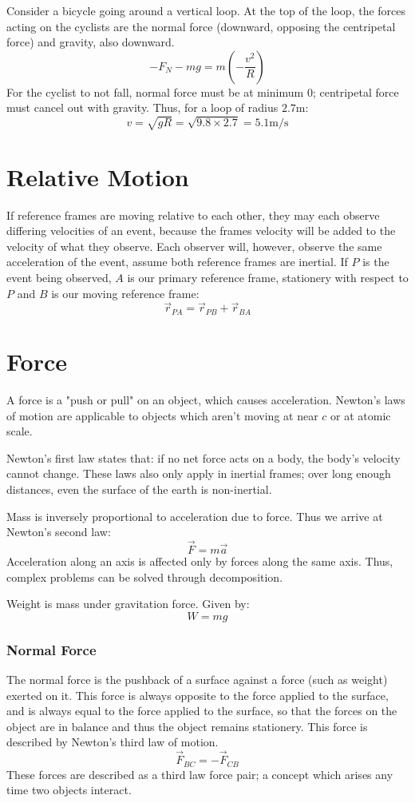 \documentclass[12pt]{report}
\begin{document}
\begin{flushleft}
\bigskip
Consider a bicycle going around a vertical loop. At the top of the loop, the forces acting on the cyclists
are the normal force (downward, opposing the centripetal force) and gravity, also downward.
\[-F_N - mg = m(-\frac{v^2}{R})\]
For the cyclist to not fall, normal force must be at minimum \(0\); centripetal force must cancel out with gravity.
Thus, for a loop of radius \(2.7\mathrm{m}\):
\[v = \sqrt{gR} = \sqrt{9.8 \times 2.7} = 5.1\mathrm{m/s}\]

\section*{Relative Motion}
If reference frames are moving relative to each other, they may each observe differing velocities of 
an event, because the frames velocity will be added to the velocity of what they observe. Each 
observer will, however, observe the same acceleration of the event, assume both reference frames
are inertial. If \(P\) is the event being observed, \(A\) is our primary reference frame, stationery
with respect to \(P\) and \(B\) is our moving reference frame:
\[\vec{r}_{PA} = \vec{r}_{PB} + \vec{r}_{BA}\]

\section*{Force}
A force is a "push or pull" on an object, which causes acceleration. Newton's laws of 
motion are applicable to objects which aren't moving at near \(c\) or at atomic scale.

\bigskip
Newton's first law states that: if no net force acts on a body, the body's velocity cannot change.
These laws also only apply in inertial frames; over long enough distances, even the surface of the 
earth is non-inertial.

\bigskip
Mass is inversely proportional to acceleration due to force. Thus we arrive at Newton's second law:
\[\vec{F} = m\vec{a}\]
Acceleration along an axis is affected only by forces along the same axis. Thus, complex
problems can be solved through decomposition.

\bigskip
Weight is mass under gravitation force. Given by:
\[W = mg\]

\subsubsection*{Normal Force}
The normal force is the pushback of a surface against a force (such as weight) exerted on it.
This force is always opposite to the force applied to the surface, and is always equal to the force
applied to the surface, so that the forces on the object are in balance and thus the object remains 
stationery. This force is described by Newton's third law of motion.
\[\vec{F}_{BC} = -\vec{F}_{CB}\]
These forces are described as a third law force pair; a concept which arises any time 
two objects interact.


\end{flushleft}
\end{document}
